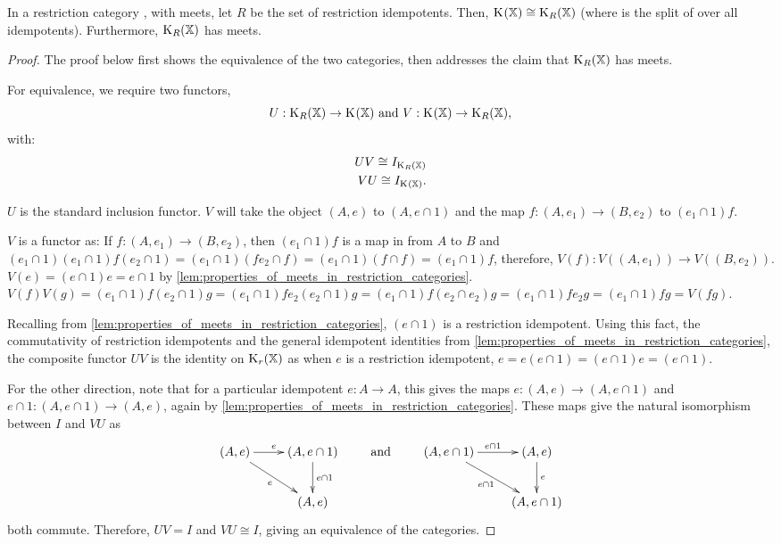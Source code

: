 \begin{proposition}\label{pro:in_rc_x_with_meets_split_x_is_cong_to_split_r_x}
In a restriction category \X, with meets, let $R$ be the set of restriction idempotents.
Then, $\text{K}_{}(\mathbb{X}) \cong \text{K}_{R}(\mathbb{X})$
(where \spl{}{\X} is the split of \X over all idempotents). Furthermore,
$\text{K}_{R}(\mathbb{X})$ has meets.
\end{proposition}
\begin{proof}
The proof below first shows the equivalence of the two categories, then addresses the claim that
$\text{K}_{R}(\mathbb{X})$ has meets.

For equivalence, we require two functors,
\[U:\text{K}_{R}(\mathbb{X})\to\text{K}_{}(\mathbb{X})\text{ and }V:\text{K}_{}(\mathbb{X})\to\text{K}_{R}(\mathbb{X}),\]
with:
\begin{align}
  U V \cong I_{\text{K}_{R}(\mathbb{X})}\\
  V U \cong I_{\text{K}_{}(\mathbb{X})}.
\end{align}


$U$ is the standard inclusion functor. $V$ will take the object $(A,e)$ to
$(A,e\cap 1)$ and the map $f:(A,e_1)\to (B,e_2)$ to $(e_1\cap 1)f $.

$V$ is a functor as:
\bd
{} If  $f:(A,e_1) \to (B,e_2)$, then
$(e_1\cap 1) f $ is a map in \X from $A$ to $B$ and
$ (e_1\cap 1)(e_1\cap 1) f  (e_2 \cap 1) =
(e_1\cap 1) (f  e_2 \cap f ) = (e_1\cap 1) (f \cap f)= (e_1\cap 1) f$, therefore,
$V(f):V((A,e_1)) \to V((B,e_2))$.
 $V(e) = (e\cap 1 ) e = e \cap 1$ by
\vref{lem:properties_of_meets_in_restriction_categories}.
 $V(f) V(g)
= (e_1\cap 1 ) f (e_2 \cap 1) g
= (e_1\cap 1 ) f e_2 (e_2 \cap 1) g
= (e_1\cap 1 ) f  (e_2 \cap e_{2}) g
= (e_1\cap 1 ) f e_2 g
= (e_1\cap 1 ) f g
= V(f g)$.
\ed

Recalling from \vref{lem:properties_of_meets_in_restriction_categories}, $(e\cap 1)$ is a restriction
 idempotent. Using this fact, the commutativity of restriction idempotents
and the general idempotent identities from  \vref{lem:properties_of_meets_in_restriction_categories}, the
composite functor $U V$ is the identity on $\text{K}_{r}(\mathbb{X})$ as when $e$ is a
restriction idempotent,
$e = e (e\cap 1) = (e\cap 1) e = (e\cap 1)$.

For the other direction,  note that for a particular idempotent $e:A\to A$,
this gives the maps $e:(A,e)\to(A,e\cap 1)$ and
$e\cap 1 : (A,e\cap 1) \to (A,e)$, again by \vref{lem:properties_of_meets_in_restriction_categories}.
These maps give the natural isomorphism between $I$ and $V U$ as
\[\xymatrix{
(A,e)\ar[r]^e \ar[dr]_{e} &(A,e\cap 1)\ar[d]^{e\cap 1}\\
&(A,e) }\qquad
\text{ and  }\qquad
\xymatrix{
(A,e\cap 1)\ar[r]^{e\cap 1} \ar[dr]_{e\cap 1} &(A,e)\ar[d]^{e}\\
&(A,e\cap 1) }
\]
both commute. Therefore, $U V = I$ and $V U \cong I$, giving
an equivalence of the categories.


\end{proof}
